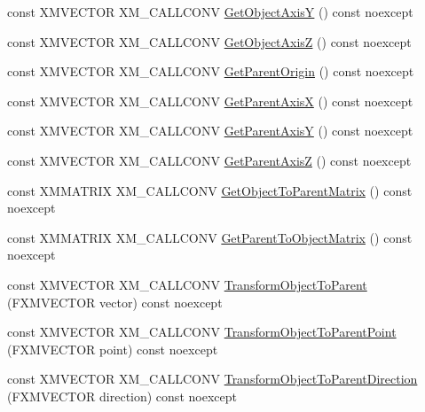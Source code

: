 \begin{DoxyCompactItemize}
const X\+M\+V\+E\+C\+T\+OR X\+M\+\_\+\+C\+A\+L\+L\+C\+O\+NV \mbox{\hyperlink{classmage_1_1_local_transform_accd789cb8a8f3cec2c048cfb05ef8eb3}{Get\+Object\+AxisY}} () const noexcept
\item 
const X\+M\+V\+E\+C\+T\+OR X\+M\+\_\+\+C\+A\+L\+L\+C\+O\+NV \mbox{\hyperlink{classmage_1_1_local_transform_a4a7a5e9b38ad3016a9f4db5c46cca782}{Get\+Object\+AxisZ}} () const noexcept
\item 
const X\+M\+V\+E\+C\+T\+OR X\+M\+\_\+\+C\+A\+L\+L\+C\+O\+NV \mbox{\hyperlink{classmage_1_1_local_transform_ad3577335f3be3237c89fe0b02b3cfd53}{Get\+Parent\+Origin}} () const noexcept
\item 
const X\+M\+V\+E\+C\+T\+OR X\+M\+\_\+\+C\+A\+L\+L\+C\+O\+NV \mbox{\hyperlink{classmage_1_1_local_transform_a211651b89d7720bf98468ea7665b74d9}{Get\+Parent\+AxisX}} () const noexcept
\item 
const X\+M\+V\+E\+C\+T\+OR X\+M\+\_\+\+C\+A\+L\+L\+C\+O\+NV \mbox{\hyperlink{classmage_1_1_local_transform_af53f1ef489bc5dec9d5b8ccea6e5e9bf}{Get\+Parent\+AxisY}} () const noexcept
\item 
const X\+M\+V\+E\+C\+T\+OR X\+M\+\_\+\+C\+A\+L\+L\+C\+O\+NV \mbox{\hyperlink{classmage_1_1_local_transform_acc8dd9207592af2db959b609bc14ae1f}{Get\+Parent\+AxisZ}} () const noexcept
\item 
const X\+M\+M\+A\+T\+R\+IX X\+M\+\_\+\+C\+A\+L\+L\+C\+O\+NV \mbox{\hyperlink{classmage_1_1_local_transform_aaf08dbe2fd5125b11e61fc052911dbb6}{Get\+Object\+To\+Parent\+Matrix}} () const noexcept
\item 
const X\+M\+M\+A\+T\+R\+IX X\+M\+\_\+\+C\+A\+L\+L\+C\+O\+NV \mbox{\hyperlink{classmage_1_1_local_transform_a3cc177e24cac45b28231943f7e7d7b03}{Get\+Parent\+To\+Object\+Matrix}} () const noexcept
\item 
const X\+M\+V\+E\+C\+T\+OR X\+M\+\_\+\+C\+A\+L\+L\+C\+O\+NV \mbox{\hyperlink{classmage_1_1_local_transform_abfd5e324acb96d0dc9b3a1a84b0403d9}{Transform\+Object\+To\+Parent}} (F\+X\+M\+V\+E\+C\+T\+OR vector) const noexcept
\item 
const X\+M\+V\+E\+C\+T\+OR X\+M\+\_\+\+C\+A\+L\+L\+C\+O\+NV \mbox{\hyperlink{classmage_1_1_local_transform_a5df12629f26c4bf4d95728333d415d53}{Transform\+Object\+To\+Parent\+Point}} (F\+X\+M\+V\+E\+C\+T\+OR point) const noexcept
\item 
const X\+M\+V\+E\+C\+T\+OR X\+M\+\_\+\+C\+A\+L\+L\+C\+O\+NV \mbox{\hyperlink{classmage_1_1_local_transform_a270150142e83d91a694d6d621b09c1ad}{Transform\+Object\+To\+Parent\+Direction}} (F\+X\+M\+V\+E\+C\+T\+OR direction) const noexcept

\end{DoxyCompactItemize}
